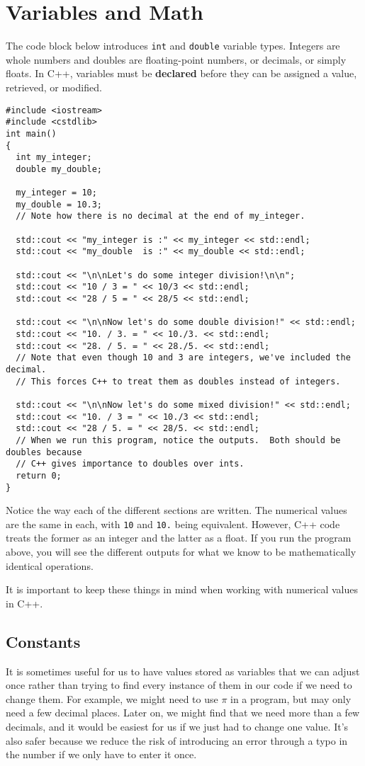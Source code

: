 \section{Variables and Math}
The code block below introduces \texttt{int} and \texttt{double} variable types.  Integers are whole numbers and doubles are floating-point numbers, or decimals, or simply floats.
In C++, variables must be \textbf{declared} before they can be assigned a value, retrieved, or modified.

\begin{verbatim}
#include <iostream>
#include <cstdlib>
int main()
{
  int my_integer;
  double my_double;

  my_integer = 10;
  my_double = 10.3;
  // Note how there is no decimal at the end of my_integer.

  std::cout << "my_integer is :" << my_integer << std::endl;
  std::cout << "my_double  is :" << my_double << std::endl;
  
  std::cout << "\n\nLet's do some integer division!\n\n";
  std::cout << "10 / 3 = " << 10/3 << std::endl;
  std::cout << "28 / 5 = " << 28/5 << std::endl;
  
  std::cout << "\n\nNow let's do some double division!" << std::endl;
  std::cout << "10. / 3. = " << 10./3. << std::endl;
  std::cout << "28. / 5. = " << 28./5. << std::endl;
  // Note that even though 10 and 3 are integers, we've included the decimal.  
  // This forces C++ to treat them as doubles instead of integers.
  
  std::cout << "\n\nNow let's do some mixed division!" << std::endl;
  std::cout << "10. / 3 = " << 10./3 << std::endl;
  std::cout << "28 / 5. = " << 28/5. << std::endl;
  // When we run this program, notice the outputs.  Both should be doubles because 
  // C++ gives importance to doubles over ints.
  return 0;
}
\end{verbatim}
Notice the way each of the different sections are written.  The numerical values are the same in each, with \texttt{10} and \texttt{10.} being equivalent.  However, C++ code treats the former as an integer and the latter as a float.  If you run the program above, you will see the different outputs for what we know to be mathematically identical operations.

It is important to keep these things in mind when working with numerical values in C++.

\subsection{Constants}
It is sometimes useful for us to have values stored as variables that we can adjust once rather than trying to find every instance of them in our code if we need to change them.  For example, we might need to use $\pi$ in a program, but may only need a few decimal places.  Later on, we might find that we need more than a few decimals, and it would be easiest for us if we just had to change one value.  It's also safer because we reduce the risk of introducing an error through a typo in the number if we only have to enter it once.

